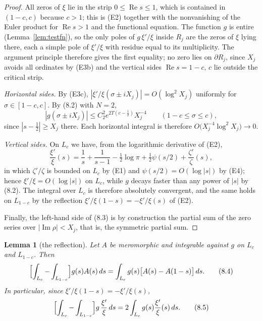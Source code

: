 \documentclass[11pt]{amsart}
\newtheorem{lemma}[theorem]{Lemma}
\theoremstyle{definition}
\theoremstyle{remark}
\newcommand{\Rel}{\operatorname{Re}}
\newcommand{\Iml}{\operatorname{Im}}
\begin{document}
\begin{proof}
All zeros of $\xi$ lie in the strip $0\le\Rel s\le1$, which is contained in
$(1-c,c)$ because $c>1$; this is (E2) together with the nonvanishing of the
Euler product for $\Rel s>1$ and the functional equation.  The function $g$ is
entire (Lemma~\ref{lem:testfn}), so the only poles of $g\,\xi'/\xi$ inside
$R_j$ are the zeros of $\xi$ lying there, each a simple pole of $\xi'/\xi$ with
residue equal to its multiplicity.  The argument principle therefore gives the
first equality; no zero lies on $\partial R_j$, since $X_j$ avoids all
ordinates by (E3b) and the vertical sides $\Rel s=1-c,\,c$ lie outside the
critical strip.

\emph{Horizontal sides.}  By (E3c), $|\xi'/\xi(\sigma\pm iX_j)|=O(\log^2X_j)$
uniformly for $\sigma\in[1-c,c]$.  By (8.2) with $N=2$,
\[
  |g(\sigma\pm iX_j)|\le C_2^2e^{2T(c-\frac12)}X_j^{-4}
  \qquad(1-c\le\sigma\le c),
\]
since $|s-\tfrac12|\ge X_j$ there.  Each horizontal integral is therefore
$O\bigl(X_j^{-4}\log^2X_j\bigr)\to0$.

\emph{Vertical sides.}  On $L_c$ we have, from the logarithmic derivative of
(E2),
\[
  \frac{\xi'}{\xi}(s)=\frac1s+\frac1{s-1}-\tfrac12\log\pi
  +\tfrac12\psi(s/2)+\frac{\zeta'}{\zeta}(s),
\]
in which $\zeta'/\zeta$ is bounded on $L_c$ by (E1) and $\psi(s/2)=O(\log|s|)$
by (E4); hence $\xi'/\xi=O(\log|s|)$ on $L_c$, while $g$ decays faster than any
power of $|s|$ by (8.2).  The integral over $L_c$ is therefore absolutely
convergent, and the same holds on $L_{1-c}$ by the reflection
$\xi'/\xi(1-s)=-\xi'/\xi(s)$ of (E2).

Finally, the left-hand side of (8.3) is by construction the partial sum of the
zero series over $|\Iml\rho|<X_j$, that is, the symmetric partial sum.
\end{proof}

\begin{lemma}[the reflection]
\label{lem:reflection}
Let $A$ be meromorphic and integrable against $g$ on $L_c$ and $L_{1-c}$.  Then
\begin{equation}
  \Bigl[\int_{L_c}-\int_{L_{1-c}}\Bigr]g(s)A(s)\,ds
  =\int_{L_c}g(s)\bigl[A(s)-A(1-s)\bigr]\,ds .
\tag{8.4}
\end{equation}
In particular, since $\xi'/\xi(1-s)=-\xi'/\xi(s)$,
\begin{equation}
  \Bigl[\int_{L_c}-\int_{L_{1-c}}\Bigr]g\,\frac{\xi'}{\xi}\,ds
  =2\int_{L_c}g(s)\frac{\xi'}{\xi}(s)\,ds .
\tag{8.5}
\end{equation}
\end{lemma}
\end{document}
